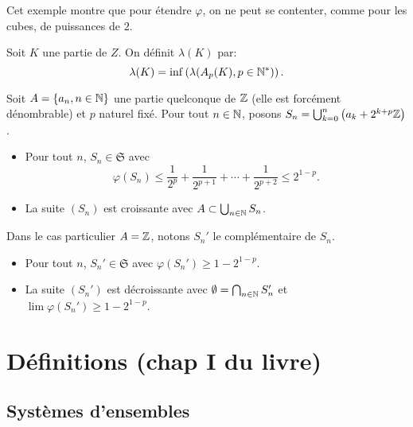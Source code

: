 Cet exemple montre que pour étendre $\varphi$, on ne peut se contenter, comme pour les cubes, de puissances de $2$.

\begin{defi}
 Soit $K$ une partie de $Z$. On définit $\lambda(K)$ par:
 \begin{displaymath}
  \lambda(K) = \inf\left( \lambda(A_p(K), p\in \mathbb{N}^*)\right).
 \end{displaymath}
\end{defi}

\begin{explen} \label{exple:SuiteUnionClassesCong}
Soit $A = \left\lbrace a_n, n \in\mathbb{N}\right\rbrace$ une partie quelconque de $\mathbb{Z}$ (elle est forcément dénombrable) et $p$ naturel fixé.\newline
Pour tout $n \in \mathbb{N}$, posons $S_n = \bigcup_{k =0}^n \left(a_k + 2^{k+p} \mathbb{Z}\right)$.
 \begin{itemize}
  \item Pour tout $n$, $S_n\in \mathfrak{S}$ avec
  \begin{displaymath}
    \varphi(S_n)\leq \frac{1}{2^p} + \frac{1}{2^{p+1}} + \cdots + \frac{1}{2^{p+2}} \leq 2^{1-p}.
  \end{displaymath}
  \item La suite $(S_n)$ est croissante avec $A \subset \bigcup_{n\in \mathbb{N}}S_n$.
 \end{itemize}
Dans le cas particulier $A=\mathbb{Z}$, notons $S_n'$ le complémentaire de $S_n$.
 \begin{itemize}
  \item Pour tout $n$, $S_n'\in \mathfrak{S}$ avec $\varphi(S_n')\geq 1- 2^{1-p}$.
  \item La suite $(S_n')$ est décroissante avec $\emptyset = \bigcap_{n\in \mathbb{N}}S'_n$ et $\lim \varphi(S_n')\geq 1- 2^{1-p}$.
 \end{itemize}
\end{explen}


\chapter{Définitions \small{(chap I du livre)}}\label{SystFoncEns}
\section{Systèmes d'ensembles}\label{SystEns}
